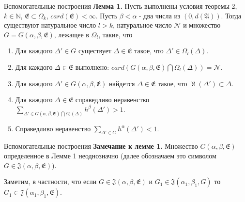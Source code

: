 \documentclass{beamer}
\begin{document}

% 
% 
% 
\begin{frame}{Вспомогательные построения}
    \textbf{Лемма 1.} Пусть выполнены условия теоремы 2, 
    $k \in \mathbb{N}$, $\mathfrak{E} \subset \Omega_k$,
    $card (\mathfrak{E}) < \infty$. Пусть
    $\beta < \alpha  $ - два числа из
    $(0, d(\mathfrak{A})).$
    Тогда существуют натуральное число $l > k$, натуральное число $\mathcal{N}$
    и множество $G = G(\alpha, \beta, \mathfrak{E})$, лежащее в $\Omega_l$,
    такие, что
    \begin{enumerate}
        \item 
            Для каждого $\Delta ' \in G$ существует
            $\Delta \in \mathfrak{E}$ такое, что 
            $\Delta' \in \Omega_l (\Delta)$.
        \item 
            Для каждого $\Delta \in \mathfrak{E}$
            выполнено:
            $card( G(\alpha, \beta, \mathfrak{E})
            \bigcap \Omega_l (\Delta)) = \mathcal{N}$.
        \item 
            Для каждого $\Delta' \in 
            G(\alpha, \beta, \mathfrak{E}) $
            найдется $\Delta \in \mathfrak{E}$ такое,
            что $\aleph (\Delta')
            \subset \Delta$.
        \item 
            Для каждого $\Delta \in \mathfrak{E}$
            справедливо неравенство
            $\underset{\Delta' \in
            G(\alpha, \beta, \mathfrak{E}) \bigcap
            \Omega_l (\Delta)}{\sum}
            h^\beta(\Delta')   > 1$.
        \item 
            Справедливо неравенство $\underset{\Delta' \in
            G}{\sum}
            h^\alpha(\Delta')   < 1$.
    \end{enumerate}
\end{frame}

% 
% 
% 
\begin{frame}{Вспомогательные построения}
    \textbf{Замечание к лемме 1.} Множество 
    $G(\alpha, \beta, \mathfrak{E})$
    определенное в Лемме 1 неоднозначно
    (далее обозначаем это символом 
    $G \in \mathfrak{J} (\alpha, \beta, \mathfrak{E})$).
    \newline
    
    Заметим, в частности, что если
    $G \in \mathfrak{J} (\alpha, \beta, \mathfrak{E})$ и
    $G_1 \in \mathfrak{J} (\alpha_1, \beta_1, G)$
    то
    $G_1 \in \mathfrak{J} (\alpha_1, \beta_1, \mathfrak{E})$.
\end{frame}
\end{document}
